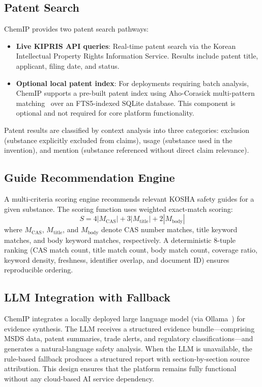 \documentclass[10pt]{article}
\begin{document}
\subsection{Patent Search}

ChemIP provides two patent search pathways:
\begin{itemize}[nosep]
  \item \textbf{Live KIPRIS API queries}: Real-time patent search via the Korean Intellectual Property Rights Information Service. Results include patent title, applicant, filing date, and status.
  \item \textbf{Optional local patent index}: For deployments requiring batch analysis, ChemIP supports a pre-built patent index using Aho-Corasick multi-pattern matching~\cite{ahocorasick} over an FTS5-indexed SQLite database. This component is optional and not required for core platform functionality.
\end{itemize}

Patent results are classified by context analysis into three categories: exclusion (substance explicitly excluded from claims), usage (substance used in the invention), and mention (substance referenced without direct claim relevance).

\subsection{Guide Recommendation Engine}

A multi-criteria scoring engine recommends relevant KOSHA safety guides for a given substance.
The scoring function uses weighted exact-match scoring:
\begin{equation}
S = 4|M_{\text{CAS}}| + 3|M_{\text{title}}| + 2|M_{\text{body}}|
\end{equation}
where $M_{\text{CAS}}$, $M_{\text{title}}$, and $M_{\text{body}}$ denote CAS number matches, title keyword matches, and body keyword matches, respectively.
A deterministic 8-tuple ranking (CAS match count, title match count, body match count, coverage ratio, keyword density, freshness, identifier overlap, and document ID) ensures reproducible ordering.

\subsection{LLM Integration with Fallback}

ChemIP integrates a locally deployed large language model (via Ollama~\cite{ollama}) for evidence synthesis.
The LLM receives a structured evidence bundle---comprising MSDS data, patent summaries, trade alerts, and regulatory classifications---and generates a natural-language safety analysis.
When the LLM is unavailable, the rule-based fallback produces a structured report with section-by-section source attribution.
This design ensures that the platform remains fully functional without any cloud-based AI service dependency.
\end{document}
